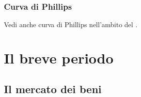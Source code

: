 \documentclass[letterpaper,10pt,italian]{jupyterBook}
\begin{document}
\subsubsection{Curva di Phillips}
\label{\detokenize{ch/macro:curva-di-phillips}}\label{\detokenize{ch/macro:economics-hs-macro-intro-macro-vars-phillips}}
\sphinxAtStartPar
Vedi anche curva di Phillips nell’ambito del {\hyperref[\detokenize{ch/macro:economics-hs-macro-medium-run-unemployment-phillips}]{}}.


\section{Il breve periodo}
\label{\detokenize{ch/macro:il-breve-periodo}}\label{\detokenize{ch/macro:economics-hs-macro-short-run}}

\subsection{Il mercato dei beni}
\label{\detokenize{ch/macro:il-mercato-dei-beni}}\label{\detokenize{ch/macro:economics-hs-macro-short-run-goods-market}}
\end{document}
